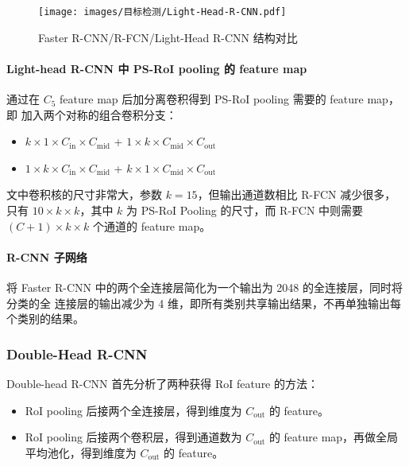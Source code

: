 \begin{figure}[ht]
  \centering
  \texttt{[image: images/目标检测/Light-Head-R-CNN.pdf]}
  \caption{Faster R-CNN/R-FCN/Light-Head R-CNN 结构对比}
  \label{fig:light-head}
\end{figure}

\paragraph{Light-head R-CNN 中 PS-RoI pooling 的 feature map}
通过在 $C_5$ feature map 后加分离卷积得到 PS-RoI pooling 需要的 feature map，即
加入两个对称的组合卷积分支：

\begin{itemize}
  \item $k \times 1 \times C_{\mathrm{in}} \times C_{\mathrm{mid}}$ + $1 \times k
    \times C_{\mathrm{mid}} \times C_{\mathrm{out}}$
  \item $1 \times k \times C_{\mathrm{in}} \times C_{\mathrm{mid}}$ + $k \times 1
    \times C_{\mathrm{mid}} \times C_{\mathrm{out}}$
\end{itemize}

文中卷积核的尺寸非常大，参数 $k=15$，但输出通道数相比 R-FCN 减少很多，只有 $10
\times k \times k$，其中 $k$ 为 PS-RoI Pooling 的尺寸，而 R-FCN 中则需要 $(C+1)
\times k \times k$ 个通道的 feature map。

\paragraph{R-CNN 子网络}
将 Faster R-CNN 中的两个全连接层简化为一个输出为 2048 的全连接层，同时将分类的全
连接层的输出减少为 4 维，即所有类别共享输出结果，不再单独输出每个类别的结果。

\subsubsection{Double-Head R-CNN}
Double-head R-CNN 首先分析了两种获得 RoI feature 的方法：

\begin{itemize}
  \item RoI pooling 后接两个全连接层，得到维度为 $C_{\mathrm{out}}$ 的 feature。
  \item RoI pooling 后接两个卷积层，得到通道数为 $C_{\mathrm{out}}$ 的 feature
    map，再做全局平均池化，得到维度为 $C_{\mathrm{out}}$ 的 feature。
\end{itemize}

